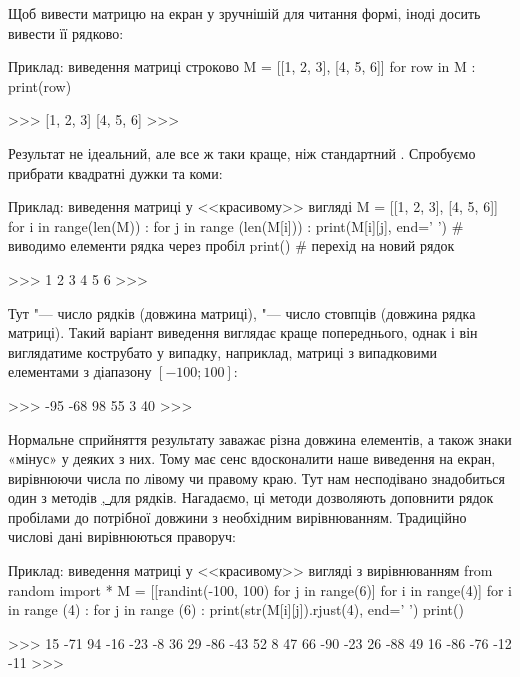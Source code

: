 Щоб вивести матрицю на екран у зручнішій для читання формі, іноді досить вивести її рядково:
\begin{pyr}
\begin{py}{Приклад: виведення матриці строково}
M = [[1, 2, 3], [4, 5, 6]]
for row in M :
    print(row)
\end{py}
\tcblower
\begin{py}{}
>>>
[1, 2, 3]
[4, 5, 6]
>>>
\end{py}
\end{pyr}
\noindent Результат не ідеальний, але все ж таки краще, ніж стандартний . Спробуємо прибрати квадратні дужки та коми:
\begin{pyr}
\begin{py}{Приклад: виведення матриці у <<красивому>> вигляді}
M = [[1, 2, 3], [4, 5, 6]]
for i in range(len(M)) : 
    for j in range (len(M[i])) : 
        print(M[i][j], end=' ') #  виводимо елементи рядка через пробіл
    print() #  перехід на новий рядок
\end{py}
\tcblower
\begin{py}{}
>>>
1 2 3
4 5 6
>>>
\end{py}
\end{pyr}
\noindent Тут  "--- число рядків (довжина матриці),  "--- число стовпців (довжина рядка матриці). Такий варіант виведення виглядає краще попереднього, однак і він виглядатиме кострубато у випадку, наприклад, матриці з випадковими елементами з діапазону $ [-100; 100] $:
\begin{py}{}
>>>
-95 -68 98
55 3 40
>>>
\end{py}
Нормальне сприйняття результату заважає різна довжина елементів, а також знаки «мінус» у деяких з них. Тому має сенс вдосконалити наше виведення на екран, вирівнюючи числа по лівому чи правому краю. Тут нам несподівано знадобиться один з методів \hyperref[rjust]{, } для рядків. Нагадаємо, ці методи дозволяють доповнити рядок пробілами до потрібної довжини з необхідним вирівнюванням. Традиційно числові дані вирівнюються праворуч:
\begin{pyr}
\begin{py}{Приклад: виведення матриці у <<красивому>> вигляді з вирівнюванням}
from random import *
M = [[randint(-100, 100) for j in range(6)] for i in range(4)]
for i in range (4) :
    for j in range (6) :
        print(str(M[i][j]).rjust(4), end=' ')
    print()
\end{py}
\tcblower
\begin{py}{}
>>>
15 -71 94 -16 -23 -8
36 29 -86 -43 52 8
47 66 -90 -23 26 -88
49 16 -86 -76 -12 -11
>>>
\end{py}
\end{pyr}

